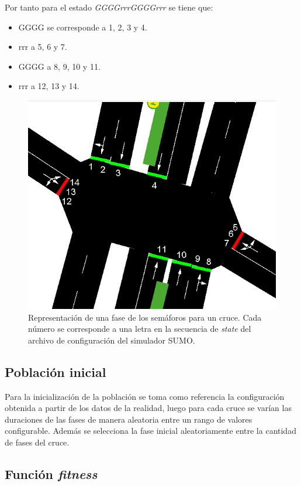 \newpage
Por tanto para el estado \emph{GGGGrrrGGGGrrr} se tiene que:
\begin{itemize}
	\item GGGG se corresponde a 1, 2, 3 y 4. 
	\item rrr a 5, 6 y 7. 
	\item GGGG a 8, 9, 10 y 11. 
	\item rrr a 12, 13 y 14. 
\end{itemize}

\begin{figure}[H]
	\centering
	\includegraphics[width=0.7\linewidth]{Figures/semaforos_numerado}
	\caption[Representación de una fase de los semáforos para un cruce.]{Representación de una fase de los semáforos para un cruce. Cada número se corresponde a una letra en la secuencia de \emph{state} del archivo de configuración del simulador SUMO.}
	\label{fig:sem_numerados}
\end{figure}

\subsection{Población inicial}

Para la inicialización de la población se toma como referencia
la configuración obtenida a partir de los datos de la realidad,  luego para cada cruce se varían las duraciones de las fases de manera aleatoria entre un rango de valores configurable. Además se selecciona la fase inicial aleatoriamente entre la cantidad de fases del cruce.

\subsection{Función \emph{fitness}}


